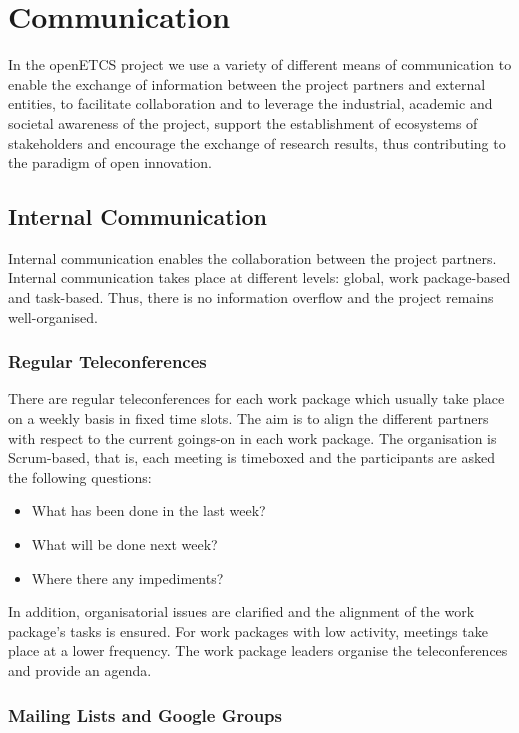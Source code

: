 \section{Communication}\label{sct:communication}
In the openETCS project we use a variety of different means of communication to enable the exchange of information between the project partners and external entities, to facilitate collaboration and to leverage the industrial, academic and societal awareness of the project, support the establishment of ecosystems of stakeholders and encourage the exchange of research results, thus contributing to the paradigm of open innovation.

\subsection{Internal Communication}

Internal communication enables the collaboration between the project partners. Internal communication takes place at different levels: global, work package-based and task-based. Thus, there is no information overflow and the project remains well-organised.

\subsubsection{Regular Teleconferences}

There are regular teleconferences for each work package which usually take place on a weekly basis in fixed time slots. The aim is to align the different partners with respect to the current goings-on in each work package. The organisation is Scrum-based, that is, each meeting is timeboxed and the participants are asked the following questions:
\begin{itemize}
\item What has been done in the last week?
\item What will be done next week?
\item Where there any impediments?
\end{itemize}

In addition, organisatorial issues are clarified and the alignment of the work package's tasks is ensured. For work packages with low activity, meetings take place at a lower frequency. The work package leaders organise the teleconferences and provide an agenda.

\subsubsection{Mailing Lists and Google Groups}

